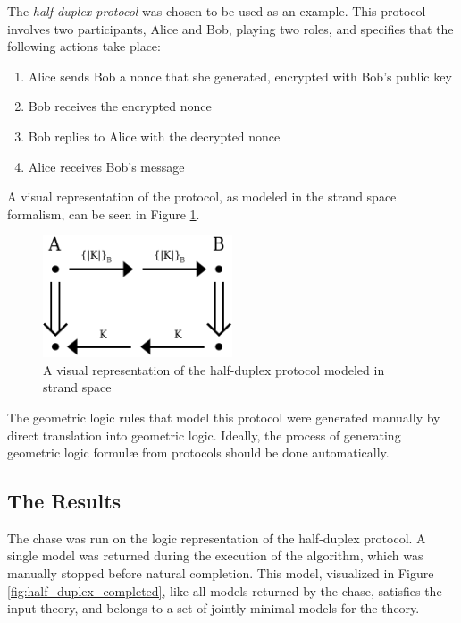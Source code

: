 		The \emph{half-duplex protocol} was chosen to be used as an example.
		This protocol involves two participants, Alice and Bob, playing two
		roles, and specifies that the following actions take place:

		\begin{enumerate}
		\item Alice sends Bob a nonce that she generated, encrypted with Bob's public key
		\item Bob receives the encrypted nonce
		\item Bob replies to Alice with the decrypted nonce
		\item Alice receives Bob's message
		\end{enumerate}

		A visual representation of the protocol, as modeled in the strand space
		formalism, can be seen in Figure \ref{fig:half_duplex}.

		\begin{figure}[h]
			\centering
			\includegraphics[width=0.5\textwidth]{half-duplex}
			\caption{
				A visual representation of the half-duplex protocol modeled in strand space
				\label{fig:half_duplex}
			}
		\end{figure}

		The geometric logic rules that model this protocol were generated
		manually by direct translation into geometric logic. Ideally, the
		process of generating geometric logic formul{\ae} from protocols should
		be done automatically.

	\subsection{The Results}

		The chase was run on the logic representation of the half-duplex protocol.
		A single model was returned during the execution of the algorithm,
		which was manually stopped before natural completion. This model,
		visualized in Figure \ref{fig:half_duplex_completed}, like all models
		returned by the chase, satisfies the input theory, and belongs to a set
		of jointly minimal models for the theory.

